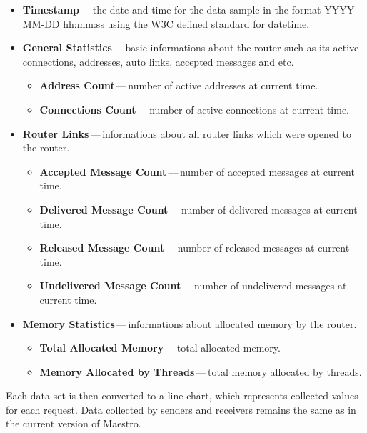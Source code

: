\begin{itemize}
	\setlength\itemsep{0em}
	\item \textbf{Timestamp}\,---\,the date and time for the data sample in the format YYYY-MM-DD hh:mm:ss using the W3C defined standard for datetime.
	\item \textbf{General Statistics}\,---\,basic informations about the router such as its active connections, addresses, auto links, accepted messages and etc.
	\begin{itemize}
		\setlength\itemsep{0em}
		\item \textbf{Address Count}\,---\,number of active addresses at current time.
		\item \textbf{Connections Count}\,---\,number of active connections at current time.
	\end{itemize}
	\item \textbf{Router Links}\,---\,informations about all router links which were opened to the router.
	\begin{itemize}
		\setlength\itemsep{0em}
		\item \textbf{Accepted Message Count}\,---\,number of accepted messages at current time.
		\item \textbf{Delivered Message Count}\,---\,number of delivered messages at current time.
		\item \textbf{Released Message Count}\,---\,number of released messages at current time.
		\item \textbf{Undelivered Message Count}\,---\,number of undelivered messages at current time.
	\end{itemize}
	\item \textbf{Memory Statistics}\,---\,informations about allocated memory by the router.
	\begin{itemize}
		\setlength\itemsep{0em}
		\item \textbf{Total Allocated Memory}\,---\,total allocated memory.
		\item \textbf{Memory Allocated by Threads}\,---\,total memory allocated by threads.
	\end{itemize}
\end{itemize}

Each data set is then converted to a line chart, which represents collected values for each request. Data collected by senders and receivers remains the same as in the current version of Maestro.
